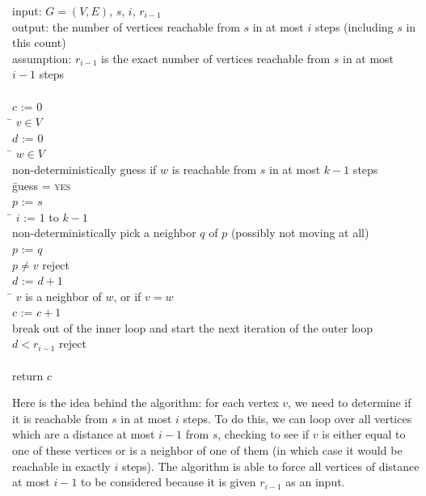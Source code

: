 \begin{program}
input: $G = (V,E)$, $s$, $i$, $r_{i-1}$ \\
output: the number of vertices reachable from $s$ in at most $i$ steps (including $s$ in this count) \\
assumption: $r_{i-1}$ is the exact number of vertices reachable from $s$ in at most $i-1$ steps \\
\\
$c$ := 0 \\
\FORALL \= $v \in V$ \DO \\
        \> $d$ := 0 \\
        \> \FORALL \= $w \in V$ \DO \\
        \>         \> non-deterministically guess if $w$ is reachable from $s$ in at most $k-1$ steps \\
        \>         \> \IF \= guess = \textsc{yes} \THEN \\
        \>         \>     \> $p$ := $s$ \\
        \>         \>     \> \FOR \= $i$ := $1$ to $k-1$ \DO \\
        \>         \>     \>      \> non-deterministically pick a neighbor $q$ of $p$ (possibly not moving at all) \\
        \>         \>     \>      \> $p$ := $q$ \\
        \>         \>     \> \IF $p \ne v$ \THEN reject \\
        \>         \>     \> $d$ := $d + 1$ \\
        \>         \>     \> \IF \= $v$ is a neighbor of $w$, or if $v = w$ \THEN \\
        \>         \>     \>     \> $c$ := $c + 1$ \\
        \>         \>     \>     \> break out of the inner loop and start the next iteration of the outer loop \\
        \>         \IF $d < r_{i-1}$ reject \\
\\
return $c$
\end{program}

Here is the idea behind the algorithm: for each vertex $v$, we need to
determine if it is reachable from $s$ in at most $i$ steps.  To do
this, we can loop over all vertices which are a distance at most $i-1$
from $s$, checking to see if $v$ is either equal to one of these vertices
or is a neighbor of one of them (in which case it would be reachable in
exactly $i$ steps).  The algorithm is able to force all vertices of distance
at most $i-1$ to be considered because it is given $r_{i-1}$ as an input.

